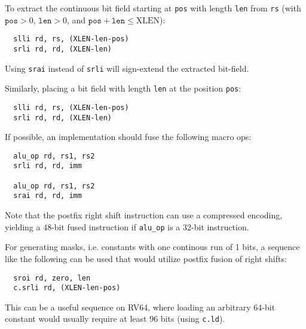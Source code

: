 To extract the continuous bit field starting at {\tt pos} with length {\tt len}
from {\tt rs} (with $\texttt{pos}>0$, $\texttt{len}>0$, and
$\texttt{pos}+\texttt{len}\le\textrm{XLEN}$):

\begin{minipage}{\linewidth}
\begin{verbatim}
  slli rd, rs, (XLEN-len-pos)
  srli rd, rd, (XLEN-len)
\end{verbatim}
\end{minipage}

Using \texttt{srai} instead of \texttt{srli} will sign-extend the extracted bit-field.

Similarly, placing a bit field with length {\tt len} at the position {\tt pos}:

\begin{minipage}{\linewidth}
\begin{verbatim}
  slli rd, rs, (XLEN-len-pos)
  srli rd, rd, (XLEN-len)
\end{verbatim}
\end{minipage}

If possible, an implementation should fuse the following macro ops:

\begin{minipage}{\linewidth}
\begin{verbatim}
  alu_op rd, rs1, rs2
  srli rd, rd, imm

  alu_op rd, rs1, rs2
  srai rd, rd, imm
\end{verbatim}
\end{minipage}

Note that the postfix right shift instruction can use a compressed encoding,
yielding a 48-bit fused instruction if {\tt alu\_op} is a 32-bit instruction.

For generating masks, i.e. constants with one continous run of 1 bits, a sequence
like the following can be used that would utilize postfix fusion of right shifts:

\begin{minipage}{\linewidth}
\begin{verbatim}
  sroi rd, zero, len
  c.srli rd, (XLEN-len-pos)
\end{verbatim}
\end{minipage}

This can be a useful sequence on RV64, where loading an arbitrary 64-bit constant would usually
require at least 96 bits (using \texttt{c.ld}).


